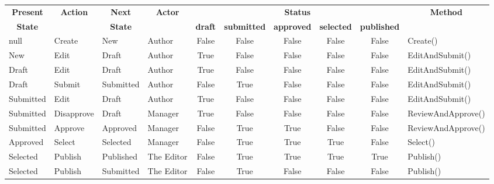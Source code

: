 \documentclass{article}
\begin{document}
\begin{center}
\begin{scriptsize}
\begin{tabular}{|l|l|l|l|c|c|c|c|c|l|} \hline
\multicolumn{1}{|c}{\bf Present} &
\multicolumn{1}{|c}{\bf Action} &
\multicolumn{1}{|c}{\bf Next} &
\multicolumn{1}{|c}{\bf Actor} &
\multicolumn{5}{|c}{\bf Status} &
\multicolumn{1}{|c|}{\bf Method} \\ \cline{5-9}
\multicolumn{1}{|c}{\bf State} &
\multicolumn{1}{|c}{\bf } &
\multicolumn{1}{|c}{\bf State} &
\multicolumn{1}{|c}{\bf } &
\multicolumn{1}{|c}{\bf draft} &
\multicolumn{1}{|c}{\bf submitted} &
\multicolumn{1}{|c}{\bf approved} &
\multicolumn{1}{|c}{\bf selected} &
\multicolumn{1}{|c}{\bf published} &
\multicolumn{1}{|c|}{\bf } \\ \hline
null 			& Create & \textsf{New} & Author & False & False & False & False & False & Create() \\ \hline
\textsf{New} 	& Edit 	& \textsf{Draft} & Author & True & False & False & False & False & EditAndSubmit() \\ \hline
\textsf{Draft} 	& Edit 	& \textsf{Draft} & Author & True & False & False & False & False & EditAndSubmit() \\ \hline
\textsf{Draft} 	& Submit 	& \textsf{Submitted} & Author & False & True & False & False & False & EditAndSubmit() \\ \hline
\textsf{Submitted} 	& Edit 	& \textsf{Draft} & Author & True & False & False & False & False & EditAndSubmit() \\ \hline
\textsf{Submitted} 	& Disapprove 	& \textsf{Draft} & Manager & True & False & False & False & False & ReviewAndApprove() \\ \hline
\textsf{Submitted} 	& Approve 	& \textsf{Approved} & Manager & False & True & True & False & False & ReviewAndApprove() \\ \hline
\textsf{Approved} 	& Select 	& \textsf{Selected} & Manager & False & True & True & True & False & Select() \\ \hline
\textsf{Selected} 	& Publish 	& \textsf{Published} & The Editor & False & True & True & True & True & Publish() \\ \hline
\textsf{Selected} 	& Publish 	& \textsf{Submitted} & The Editor & False & True & False & False & False & Publish() \\ \hline
\end{tabular}
\end{scriptsize}
\end{center}
\end{document}
